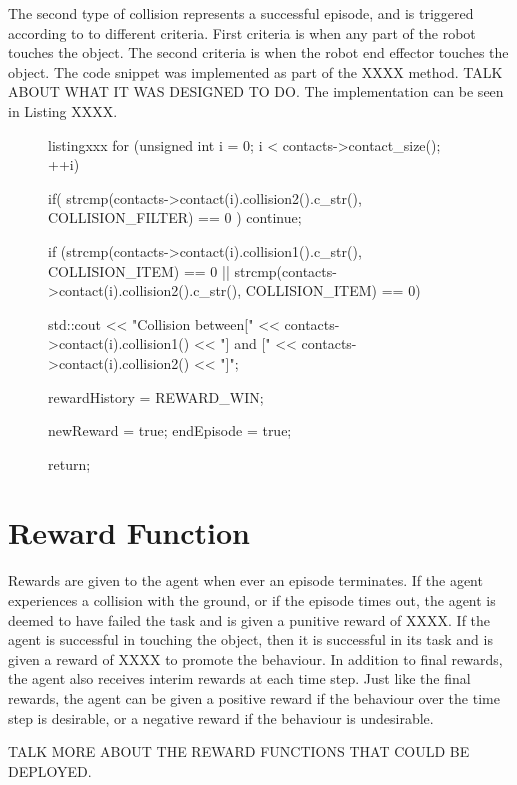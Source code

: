\documentclass[a4paper]{article}
\begin{document}
The second type of collision represents a successful episode, and is triggered according to to different criteria. First criteria is when any part of the robot touches the object. The second criteria is when the robot end effector touches the object. The code snippet was implemented as part of the XXXX method. TALK ABOUT WHAT IT WAS DESIGNED TO DO. The implementation can be seen in Listing XXXX.
\begin{figure}[h]\scriptsize
\begin{sexylisting}{listingxxx}
for (unsigned int i = 0; i < contacts->contact_size(); ++i){
	
    if( strcmp(contacts->contact(i).collision2().c_str(), COLLISION_FILTER) == 0 )
        continue;
		
    if (strcmp(contacts->contact(i).collision1().c_str(), COLLISION_ITEM) == 0 ||
        strcmp(contacts->contact(i).collision2().c_str(), COLLISION_ITEM) == 0){
			
            std::cout << "Collision between[" << contacts->contact(i).collision1()
                      << "] and [" << contacts->contact(i).collision2() << "]\n";

            rewardHistory = REWARD_WIN;

            newReward  = true;
            endEpisode = true;

            return;
	}
}
\end{sexylisting}
\end{figure} 


\section{Reward Function}
Rewards are given to the agent when ever an episode terminates. If the agent experiences a collision with the ground, or if the episode times out, the agent is deemed to have failed the task and is given a punitive reward of XXXX. If the agent is successful in touching the object, then it is successful in its task and is given a reward of XXXX to promote the behaviour. In addition to final rewards, the agent also receives interim rewards at each time step. Just like the final rewards, the agent can be given a positive reward if the behaviour over the time step is desirable, or a negative reward if the behaviour is undesirable.

TALK MORE ABOUT THE REWARD FUNCTIONS THAT COULD BE DEPLOYED.
\end{document}
